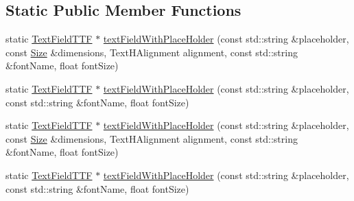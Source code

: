 \subsection*{Static Public Member Functions}
\begin{DoxyCompactItemize}
\item 
static \hyperlink{classTextFieldTTF}{Text\+Field\+T\+TF} $\ast$ \hyperlink{classTextFieldTTF_a42b4eb541cbbdbe8e87559568b742d6b}{text\+Field\+With\+Place\+Holder} (const std\+::string \&placeholder, const \hyperlink{classSize}{Size} \&dimensions, Text\+H\+Alignment alignment, const std\+::string \&font\+Name, float font\+Size)
\item 
static \hyperlink{classTextFieldTTF}{Text\+Field\+T\+TF} $\ast$ \hyperlink{classTextFieldTTF_afb2fa2ddb80c61b34240a7aa20bff7d5}{text\+Field\+With\+Place\+Holder} (const std\+::string \&placeholder, const std\+::string \&font\+Name, float font\+Size)
\item 
static \hyperlink{classTextFieldTTF}{Text\+Field\+T\+TF} $\ast$ \hyperlink{classTextFieldTTF_ae1e5accacb9d9708529a5daa653ae17e}{text\+Field\+With\+Place\+Holder} (const std\+::string \&placeholder, const \hyperlink{classSize}{Size} \&dimensions, Text\+H\+Alignment alignment, const std\+::string \&font\+Name, float font\+Size)
\item 
static \hyperlink{classTextFieldTTF}{Text\+Field\+T\+TF} $\ast$ \hyperlink{classTextFieldTTF_af5bdaba3727ac446fbaf714b799aee19}{text\+Field\+With\+Place\+Holder} (const std\+::string \&placeholder, const std\+::string \&font\+Name, float font\+Size)
\end{DoxyCompactItemize}
